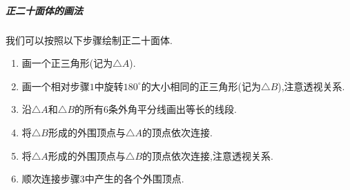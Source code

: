 \documentclass{ctexart}
\begin{document}
\subparagraph{正二十面体的画法}
我们可以按照以下步骤绘制正二十面体.
\begin{enumerate}[label=$\mathit{Step\ \arabic*.}$,topsep=0pt,parsep=0pt,itemsep=0pt,partopsep=0pt,leftmargin=*]
    \item 画一个正三角形(记为$\triangle{A}$).
    \item 画一个相对步骤$\mathit{1}$中旋转$180^\circ$的大小相同的正三角形(记为$\triangle{B}$),注意透视关系.
    \item 沿$\triangle{A}$和$\triangle{B}$的所有$6$条外角平分线画出等长的线段.
    \item 将$\triangle{B}$形成的外围顶点与$\triangle{A}$的顶点依次连接.
    \item 将$\triangle{A}$形成的外围顶点与$\triangle{B}$的顶点依次连接,注意透视关系.
    \item 顺次连接步骤$\mathit{3}$中产生的各个外围顶点.
\end{enumerate}
\end{document}
